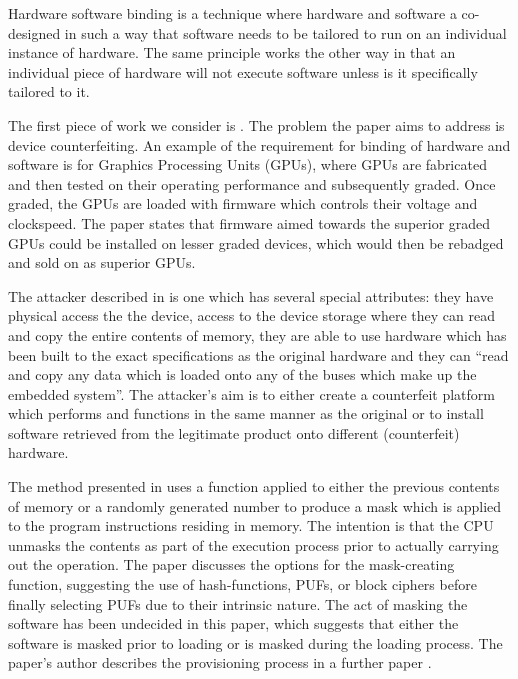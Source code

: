 Hardware software binding is a technique where hardware and software a co-designed in such a way that software needs to be tailored to run on an individual instance of hardware. The same principle works the other way in that an individual piece of hardware will not execute software unless is it specifically tailored to it.

The first piece of work we consider is \cite{Lee2016}. The problem the paper aims to address is device counterfeiting. An example of the requirement for binding of hardware and software is for Graphics Processing Units (GPUs), where GPUs are fabricated and then tested on their operating performance and subsequently graded. Once graded, the GPUs are loaded with firmware which controls their voltage and clockspeed. The paper states that firmware aimed towards the superior graded GPUs could be installed on lesser graded devices, which would then be rebadged and sold on as superior GPUs.

The attacker described in \cite{Lee2016} is one which has several special attributes: they have physical access the the device, access to the device storage where they can read and copy the entire contents of memory, they are able to use hardware which has been built to the exact specifications as the original hardware and they can ``read and copy any data which is loaded onto any of the buses which make up the embedded system''. The attacker's aim is to either create a counterfeit platform which performs and functions in the same manner as the original or to install software retrieved from the legitimate product onto different (counterfeit) hardware.

The method presented in \cite{Lee2016} uses a function applied to either the previous contents of memory or a randomly generated number to produce a mask which is applied to the program instructions residing in memory. The intention is that the CPU unmasks the contents as part of the execution process prior to actually carrying out the operation. The paper discusses the options for the mask-creating function, suggesting the use of hash-functions, PUFs, or block ciphers before finally selecting PUFs due to their intrinsic nature. The act of masking the software has been undecided in this paper, which suggests that either the software is masked prior to loading or is masked during the loading process. The paper's author describes the provisioning process in a further paper \cite{Lee2017}.

